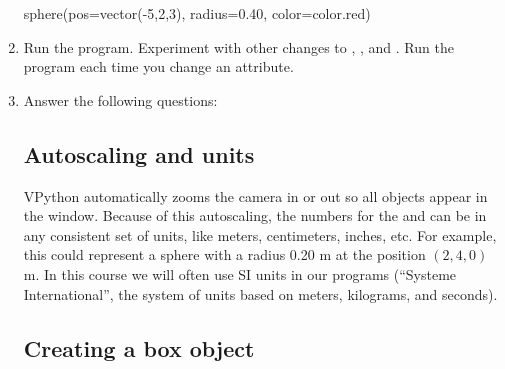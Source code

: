 \begin{enumerate}
\begin{myvpython}	
sphere(pos=vector(-5,2,3), radius=0.40, color=color.red)
\end{myvpython}

	\item Run the program.  Experiment with other changes to , , and . Run the program each time you change an attribute.
	
	\item Answer the following questions:
	

	\subsection*{Autoscaling and units}

VPython automatically zooms the camera in or out so all objects appear in the window. Because of this autoscaling, the numbers for the  and  can be in any consistent set of units, like meters, centimeters, inches, etc. For example, this could represent a sphere with a radius 0.20 m at the position $(2,4,0)$ m. In this course we will often use SI units in our programs (``Systeme International'', the system of units based on meters, kilograms, and seconds).

	\subsection*{Creating a box object}


\end{enumerate}
